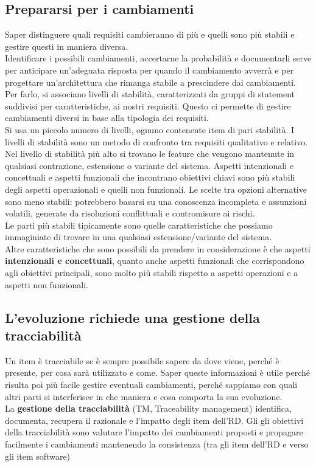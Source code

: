 \subsection{Prepararsi per i cambiamenti}
Saper distinguere quali requisiti cambieranno di più e quelli sono più stabili e gestire questi in maniera diversa.\\
Identificare i possibili cambiamenti, accertarne la probabilità e documentarli serve per anticipare un’adeguata risposta per quando il cambiamento avverrà e per progettare un’architettura che rimanga stabile a prescindere dai cambiamenti.\\
Per farlo, si associano livelli di stabilità, caratterizzati da gruppi di statement suddivisi per caratteristiche, ai nostri requisiti. Questo ci permette di gestire cambiamenti diversi in base alla tipologia dei requisiti.\\ Si usa un piccolo numero di livelli, ognuno contenente item di pari stabilità.
I livelli di stabilità sono un metodo di confronto tra requisiti qualitativo e relativo.\\
Nel livello di stabilità più alto si trovano le feature che vengono mantenute in qualsiasi contrazione, estensione o variante del sistema.
Aspetti intenzionali e concettuali e aspetti funzionali che incontrano obiettivi chiavi sono più stabili degli aspetti operazionali e quelli non funzionali.
Le scelte tra opzioni alternative sono meno stabili: potrebbero basarsi su una conoscenza incompleta e assunzioni volatili, generate da risoluzioni conflittuali e contromisure ai rischi.\\

Le parti più stabili tipicamente sono quelle caratteristiche che possiamo immaginiate di trovare in una qualsiasi estensione/variante del sistema.\\
Altre caratteristiche che sono possibili da prendere in considerazione è che aspetti \textbf{intenzionali e concettuali}, quanto anche aspetti funzionali che corrispondono agli obiettivi principali, sono molto più stabili rispetto a aspetti operazioni e a aspetti non funzionali.\\

\subsection{L’evoluzione richiede una gestione della tracciabilità}
Un item è tracciabile se è sempre possibile sapere da dove viene, perché è presente, per cosa sarà utilizzato e come. Saper queste informazioni è utile perché risulta poi più facile gestire eventuali cambiamenti, perché sappiamo con quali altri parti si interferisce in che maniera e cosa comporta la sua evoluzione.\\
La \textbf{gestione della tracciabilità} (TM, Traceability management) identifica, documenta, recupera il razionale e l’impatto degli item dell’RD.
Gli gli obiettivi della tracciabilità sono valutare l’impatto dei cambiamenti proposti e propagare facilmente i cambiamenti mantenendo la consistenza (tra gli item dell’RD e verso gli item software)\\

